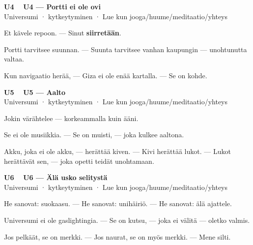 \documentclass[a4paper,11pt]{article}
\begin{document}
\filbreak
\vspace{0.9mm}
\noindent
\begin{tcolorbox}[
  colframe=unicol,
  colback=white,
  boxrule=0.8pt,
  arc=0pt,
  outer arc=0pt,
  left=2.5mm, right=2.5mm, top=2mm, bottom=2mm,
  boxsep=0.5mm,
  sharp corners,
  enhanced,
  breakable=false
]
{\large\ttfamily\bfseries U4}~~
{\normalsize\bfseries U4 --- Portti ei ole ovi}\\[0.2em]
{\small\color{black!65} Universumi · kytkeytyminen · Lue kun jooga/huume/meditaatio/yhteys}\\[0.35em]
{\normalsize\raggedright Et kävele repoon. --- Sinut \textbf{siirretään}.

Portti tarvitsee suunnan. --- Suunta tarvitsee vanhan kaupungin --- unohtunutta valtaa.

Kun navigaatio herää, --- Giza ei ole enää kartalla. --- Se on kohde.}
\end{tcolorbox}

\filbreak
\vspace{0.9mm}
\noindent
\begin{tcolorbox}[
  colframe=unicol,
  colback=white,
  boxrule=0.8pt,
  arc=0pt,
  outer arc=0pt,
  left=2.5mm, right=2.5mm, top=2mm, bottom=2mm,
  boxsep=0.5mm,
  sharp corners,
  enhanced,
  breakable=false
]
{\large\ttfamily\bfseries U5}~~
{\normalsize\bfseries U5 --- Aalto}\\[0.2em]
{\small\color{black!65} Universumi · kytkeytyminen · Lue kun jooga/huume/meditaatio/yhteys}\\[0.35em]
{\normalsize\raggedright Jokin värähtelee --- korkeammalla kuin ääni.

Se ei ole musiikkia. --- Se on muisti, --- joka kulkee aaltona.

Akku, joka ei ole akku, --- herättää kiven. --- Kivi herättää lukot. --- Lukot herättävät sen, --- joka opetti teidät unohtamaan.}
\end{tcolorbox}

\filbreak
\vspace{0.9mm}
\noindent
\begin{tcolorbox}[
  colframe=unicol,
  colback=white,
  boxrule=0.8pt,
  arc=0pt,
  outer arc=0pt,
  left=2.5mm, right=2.5mm, top=2mm, bottom=2mm,
  boxsep=0.5mm,
  sharp corners,
  enhanced,
  breakable=false
]
{\large\ttfamily\bfseries U6}~~
{\normalsize\bfseries U6 --- Älä usko selitystä}\\[0.2em]
{\small\color{black!65} Universumi · kytkeytyminen · Lue kun jooga/huume/meditaatio/yhteys}\\[0.35em]
{\normalsize\raggedright He sanovat: suokaasu. --- He sanovat: unihäiriö. --- He sanovat: älä ajattele.

Universumi ei ole gaslightingia. --- Se on kutsu, --- joka ei välitä --- oletko valmis.

Jos pelkäät, se on merkki. --- Jos naurat, se on myös merkki. --- Mene silti.}
\end{tcolorbox}
\end{document}
